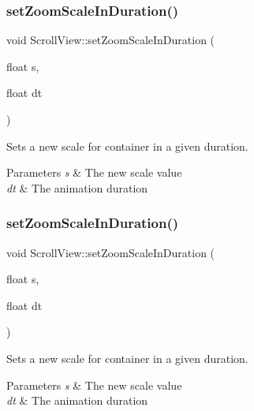 \subsubsection{\texorpdfstring{set\+Zoom\+Scale\+In\+Duration()}{setZoomScaleInDuration()}\hspace{0.1cm}{\footnotesize\ttfamily [1/2]}}
{\footnotesize\ttfamily void Scroll\+View\+::set\+Zoom\+Scale\+In\+Duration (\begin{DoxyParamCaption}\item[{float}]{s,  }\item[{float}]{dt }\end{DoxyParamCaption})}

Sets a new scale for container in a given duration.


\begin{DoxyParams}{Parameters}
{\em s} & The new scale value \\
\hline
{\em dt} & The animation duration \\
\hline
\end{DoxyParams}
\mbox{\label{classScrollView_a04c9d8527dc9a0b883324c90d5b30ae2}} 
\subsubsection{\texorpdfstring{set\+Zoom\+Scale\+In\+Duration()}{setZoomScaleInDuration()}\hspace{0.1cm}{\footnotesize\ttfamily [2/2]}}
{\footnotesize\ttfamily void Scroll\+View\+::set\+Zoom\+Scale\+In\+Duration (\begin{DoxyParamCaption}\item[{float}]{s,  }\item[{float}]{dt }\end{DoxyParamCaption})}

Sets a new scale for container in a given duration.


\begin{DoxyParams}{Parameters}
{\em s} & The new scale value \\
\hline
{\em dt} & The animation duration \\
\hline
\end{DoxyParams}
\mbox{\label{classScrollView_a13c84492be7e7c8e06a29f6bd3bdcc7e}} 
